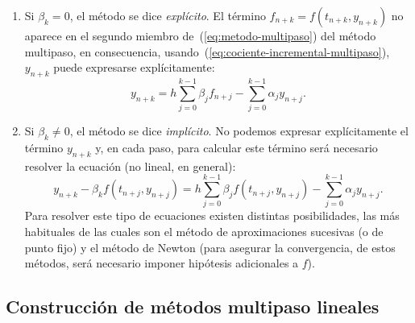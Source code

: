 \begin{enumerate}
\item Si $\beta_k=0$, el método se dice \emph{explícito}. El término
  $f_{n+k}=f(t_{n+k},y_{n+k})$ no aparece en el segundo miembro
  de~(\ref{eq:metodo-multipaso}) del método multipaso, en
  consecuencia, usando~(\ref{eq:cociente-incremental-multipaso}),
  $y_{n+k}$ puede expresarse explícitamente:
  \begin{equation*}
    y_{n+k}=  
    h\sum_{j=0}^{k-1} \beta_j f_{n+j}-\sum_{j=0}^{k-1}\alpha_j y_{n+j}.
  \end{equation*}
\item Si $\beta_k\neq 0$, el método se dice \emph{implícito}. No podemos
  expresar explícitamente el término $y_{n+k}$ y, en cada paso,
  para calcular este término será necesario resolver la ecuación (no
  lineal, en general):
  \begin{equation*}
    y_{n+k} - \beta_k f(t_{n+j},y_{n+j})= 
     h\sum_{j=0}^{k-1} \beta_j f(t_{n+j},y_{n+j})- \sum_{j=0}^{k-1}\alpha_j y_{n+j} .
  \end{equation*}
  Para resolver este tipo de ecuaciones existen distintas
  posibilidades, las más habituales de las cuales son el método de
  aproximaciones sucesivas (o de punto fijo) y el método de Newton
  (para asegurar la convergencia, de estos métodos, será necesario
  imponer hipótesis adicionales a $f$).
\end{enumerate}

\subsection{Construcción de métodos multipaso lineales}

